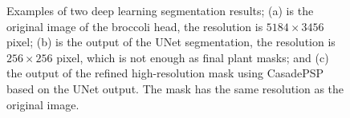 \begin{figure}[htbp!]
  \begin{center}
  \end{center}
  \caption[Two deep learning segmentation results]{
    Examples of two deep learning segmentation results; (a) is the original image of the broccoli head, the resolution is $5184 \times 3456$ pixel; (b) is the output of the UNet segmentation, the resolution is $256 \times 256$ pixel, which is not enough as final plant masks; and (c) the output of the refined high-resolution mask using CasadePSP based on the UNet output. The mask has the same resolution as the original image.
  }
  \label{fig:des_dl_seg}
\end{figure}